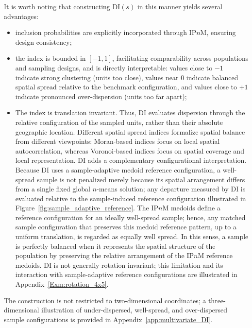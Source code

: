 \documentclass[12pt]{imsart}
\theoremstyle{plain}
\theoremstyle{remark}
\begin{document}
It is worth noting that constructing \(\mathrm{DI}(s)\) in this manner yields
several advantages:
\begin{itemize}
    \item[(i)] inclusion probabilities are explicitly incorporated through
    IP\(n\)M, ensuring design consistency;
    
    \item[(ii)] the index is bounded in \([-1,1]\), facilitating comparability
    across populations and sampling designs, and is directly interpretable:
    values close to \(-1\) indicate strong clustering (units too close), values
    near \(0\) indicate balanced spatial spread relative to the benchmark
    configuration, and values close to \(+1\) indicate pronounced
    over-dispersion (units too far apart);
    
    \item[(iii)]  The index is translation invariant. Thus, DI evaluates
dispersion through the relative configuration of the sampled units, rather
than their absolute geographic location. Different spatial spread indices
formalize spatial balance from different viewpoints: Moran-based indices focus
on local spatial autocorrelation, whereas Voronoi-based indices focus on
spatial coverage and local representation. DI adds a complementary
configurational interpretation. Because DI uses a sample-adaptive medoid reference configuration, a
well-spread sample is not penalized merely because its spatial arrangement
differs from a single fixed global \(n\)-means solution; any departure
measured by DI is evaluated relative to the sample-induced reference
configuration illustrated in
Figure~\ref{fig:sample_adaptive_reference}. The IP\(n\)M medoids define a reference configuration for an ideally well-spread sample; hence, any matched sample configuration that preserves this medoid reference pattern, up to a uniform
translation, is regarded as equally well spread. In this sense, a sample is
perfectly balanced when it represents the spatial structure of the population
by preserving the relative arrangement of the IP\(n\)M reference medoids. DI is not generally rotation invariant; this limitation and
its interaction with sample-adaptive reference configurations are illustrated
in Appendix~\ref{Exm:rotation_4x5}.
\end{itemize}
The construction is not restricted to two-dimensional coordinates; a
three-dimensional illustration of under-dispersed, well-spread, and
over-dispersed sample configurations is provided in
Appendix~\ref{app:multivariate_DI}.
\end{document}
